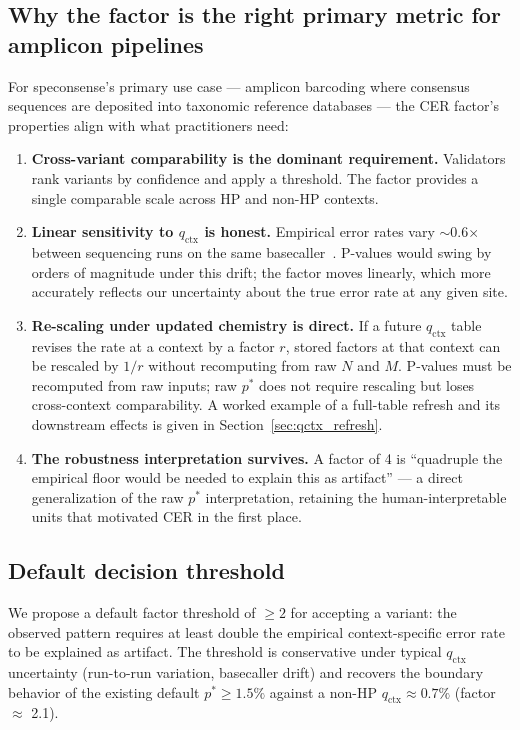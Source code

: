 \documentclass[11pt]{article}
\begin{document}
\subsection{Why the factor is the right primary metric for amplicon pipelines}

For speconsense's primary use case --- amplicon barcoding where consensus
sequences are deposited into taxonomic reference databases --- the CER factor's
properties align with what practitioners need:

\begin{enumerate}
\item \textbf{Cross-variant comparability is the dominant requirement.}
Validators rank variants by confidence and apply a threshold. The factor
provides a single comparable scale across HP and non-HP contexts.

\item \textbf{Linear sensitivity to $q_\text{ctx}$ is honest.} Empirical
error rates vary $\sim$0.6$\times$ between sequencing runs on the same
basecaller~\cite{hp_paper}. P-values would swing by orders of magnitude under
this drift; the factor moves linearly, which more accurately reflects our
uncertainty about the true error rate at any given site.

\item \textbf{Re-scaling under updated chemistry is direct.} If a future
$q_\text{ctx}$ table revises the rate at a context by a factor $r$, stored
factors at that context can be rescaled by $1/r$ without recomputing from raw
$N$ and $M$. P-values must be recomputed from raw inputs; raw $p^*$ does not
require rescaling but loses cross-context comparability. A worked example of a
full-table refresh and its downstream effects is given in
Section~\ref{sec:qctx_refresh}.

\item \textbf{The robustness interpretation survives.} A factor of 4 is
``quadruple the empirical floor would be needed to explain this as artifact''
--- a direct generalization of the raw $p^*$ interpretation, retaining the
human-interpretable units that motivated CER in the first place.
\end{enumerate}

\subsection{Default decision threshold}

We propose a default factor threshold of $\geq 2$ for accepting a variant: the
observed pattern requires at least double the empirical context-specific error
rate to be explained as artifact. The threshold is conservative under typical
$q_\text{ctx}$ uncertainty (run-to-run variation, basecaller drift) and
recovers the boundary behavior of the existing default $p^* \geq 1.5\%$
against a non-HP $q_\text{ctx} \approx 0.7\%$ (factor $\approx$ 2.1).
\end{document}
